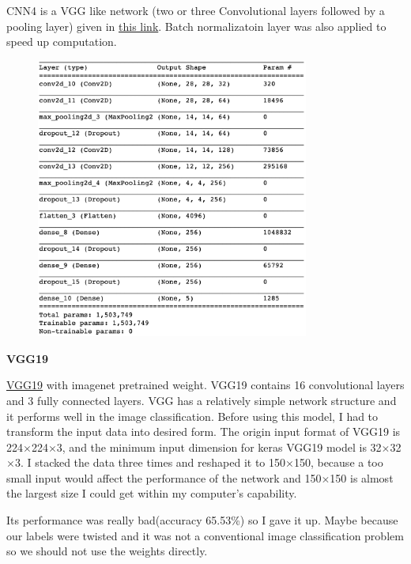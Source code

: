 \documentclass[12pt]{article}
\begin{document}
CNN4 is a VGG like network (two or three Convolutional layers followed by a pooling layer) given in \href{http://proc-x.com/2017/09/a-vgg-like-cnn-for-fashion-mnist-with-94-accuracy/}{this link}. Batch normalizatoin layer was also applied to speed up computation.
\begin{figure}[H]
\begin{center}
    \includegraphics[width=0.8\textwidth]{./plots/4.png}
\end{center}
\end{figure}
\vspace*{-1.0cm}

\textbf{VGG19}

\href{https://arxiv.org/pdf/1409.1556.pdf}{VGG19} with imagenet pretrained weight. VGG19 contains 16 convolutional layers and 3 fully connected layers. VGG has a relatively simple network structure and it performs well in the image classification. Before using this model, I had to transform the input data into desired form. The origin input format of VGG19 is 224$\times$224$\times$3, and the minimum input dimension for keras VGG19 model is 32$\times$32$\times$3. I stacked the data three times and reshaped it to 150$\times$150, because a too small input would affect the performance of the network and 150$\times$150 is almost the largest size I could get within my computer's capability.

Its performance was really bad(accuracy 65.53\%) so I gave it up. Maybe because our labels were twisted and it was not a conventional image classification problem so we should not use the weights directly. 
\end{document}
